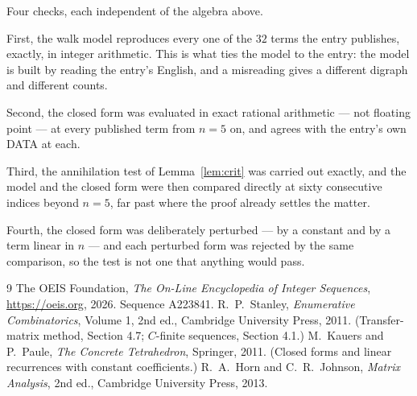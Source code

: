 \documentclass[11pt,a4paper]{article}
\theoremstyle{plain}
\theoremstyle{definition}
\begin{document}
Four checks, each independent of the algebra above.

First, the walk model reproduces every one of the $32$ terms the entry publishes,
exactly, in integer arithmetic. This is what ties the model to the entry: the model is built
by reading the entry's English, and a misreading gives a different digraph and different
counts.

Second, the closed form was evaluated in exact rational arithmetic --- not floating point ---
at every published term from $n=5$ on, and agrees with the entry's own DATA at each.

Third, the annihilation test of Lemma~\ref{lem:crit} was carried out exactly, and the model
and the closed form were then compared directly at sixty consecutive indices beyond
$n=5$, far past where the proof already settles the matter.

Fourth, the closed form was deliberately perturbed --- by a constant and by a term linear in
$n$ --- and each perturbed form was rejected by the same comparison, so the test is not one
that anything would pass.

\begin{thebibliography}{9}
 The OEIS Foundation, \emph{The On-Line Encyclopedia of Integer
Sequences}, \url{https://oeis.org}, 2026. Sequence A223841.
 R.~P.~Stanley, \emph{Enumerative Combinatorics}, Volume 1, 2nd ed.,
Cambridge University Press, 2011. (Transfer-matrix method, Section 4.7; $C$-finite sequences,
Section 4.1.)
 M.~Kauers and P.~Paule, \emph{The Concrete Tetrahedron}, Springer, 2011.
(Closed forms and linear recurrences with constant coefficients.)
 R.~A.~Horn and C.~R.~Johnson, \emph{Matrix Analysis}, 2nd ed., Cambridge
University Press, 2013.
\end{thebibliography}
\end{document}
